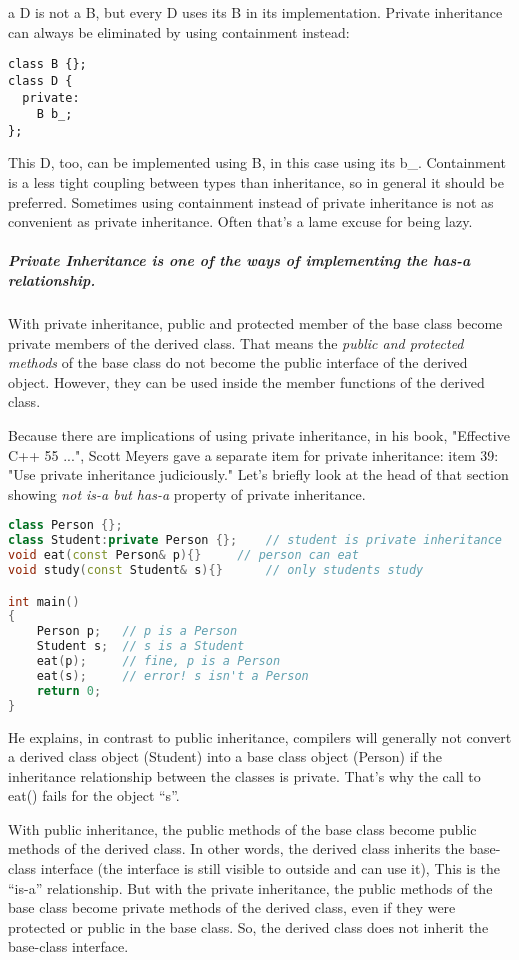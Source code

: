 \documentclass{book}
\begin{document}
a D is not a B, but every D uses its B in its implementation. Private inheritance can always be eliminated by using containment instead:

\begin{verbatim}
class B {};
class D {
  private: 
    B b_;
};
\end{verbatim}

This D, too, can be implemented using B, in this case using its b\_.
Containment is a less tight coupling between types than inheritance, so in general it should be preferred.
Sometimes using containment instead of private inheritance is not as convenient as private inheritance. Often that's a lame excuse for being lazy. 
\subparagraph{Private Inheritance is one of the ways of implementing the has-a relationship.}
With private inheritance, public and protected member of the base class become private members of the derived class.
That means the \textit{public and protected methods} of the base class do not become the public interface of the derived object.
However, they can be used inside the member functions of the derived class.

Because there are implications of using private inheritance, in his book, "Effective C++ 55 ...",
Scott Meyers gave a separate item for private inheritance: item 39: "Use private inheritance judiciously."
Let's briefly look at the head of that section showing \textit{not is-a but has-a} property of private inheritance.

\begin{lstlisting}[caption={Private inheritance exmaple 2}, language=C++]
class Person {};
class Student:private Person {};	// student is private inheritance
void eat(const Person& p){}		// person can eat
void study(const Student& s){}		// only students study

int main() 
{
	Person p;	// p is a Person
	Student s;	// s is a Student
	eat(p);		// fine, p is a Person
	eat(s);		// error! s isn't a Person
	return 0;
}
\end{lstlisting}

He explains, in contrast to public inheritance,
compilers will generally not convert a derived class object (Student) into a base class object (Person) if the inheritance relationship between the classes is private.
That's why the call to eat() fails for the object ``s''.

With public inheritance, the public methods of the base class become public methods of the derived class.
In other words, the derived class inherits the base-class interface (the interface is still visible to outside and can use it), This is the ``is-a'' relationship. 
But with the private inheritance, the public methods of the base class become private methods of the derived class,
even if they were protected or public in the base class. So, the derived class does not inherit the base-class interface.
\end{document}
